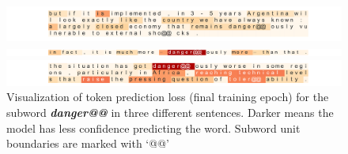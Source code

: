 \begin{figure}[htb!]
\begin{minipage}{\textwidth} 
\begin{center}
\includegraphics[width=\textwidth]{05-research-03/figs/sent1}    
\end{center}
\end{minipage}   
\par\smallskip %
\hspace{\fill}  %
\begin{minipage}{\textwidth} 
\includegraphics[width=\textwidth]{05-research-03/figs/sent3}    
\end{minipage}   
\par\smallskip %
\begin{minipage}{\textwidth} 
\includegraphics[width=\textwidth]{05-research-03/figs/sent4}    
\end{minipage}  
\caption{Visualization of token prediction loss (final training epoch) for the subword \textit{\textbf{danger@@}} in three different sentences. Darker means the model has less confidence predicting the word. Subword unit boundaries are marked with `@@' \label{loosexamples}}  
\end{figure}


